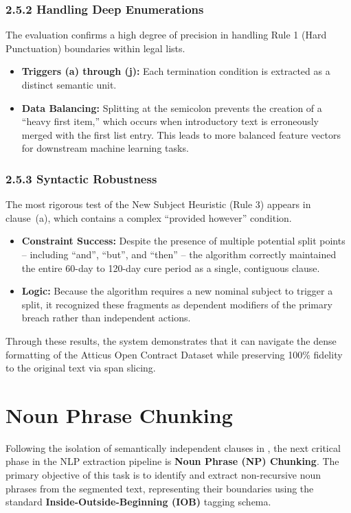 \documentclass[twoside,final]{hcmut-report}
\newcommand{\result}[1]{\fcolorbox{red}{white}{#1}}
\begin{document}
\subsubsection*{2.5.2 Handling Deep Enumerations}
The evaluation confirms a high degree of precision in handling Rule 1 (Hard Punctuation) boundaries within legal lists.

\begin{itemize}[topsep=0pt, parsep=0pt, itemsep=0pt]
  \item \textbf{Triggers (a) through (j):} Each termination condition is extracted as a distinct semantic unit.
  \item \textbf{Data Balancing:} Splitting at the semicolon prevents the creation of a ``heavy first item,'' which occurs when introductory text is erroneously merged with the first list entry. This leads to more balanced feature vectors for downstream machine learning tasks.
\end{itemize}

\subsubsection*{2.5.3 Syntactic Robustness}
The most rigorous test of the New Subject Heuristic (Rule 3) appears in clause~(a), which contains a complex ``provided however'' condition.

\begin{itemize}[topsep=0pt, parsep=0pt, itemsep=0pt]
  \item \textbf{Constraint Success:} Despite the presence of multiple potential split points -- including ``and'', ``but'', and ``then'' -- the algorithm correctly maintained the entire 60-day to 120-day cure period as a single, contiguous clause.
  \item \textbf{Logic:} Because the algorithm requires a new nominal subject to trigger a split, it recognized these fragments as dependent modifiers of the primary breach rather than independent actions.
\end{itemize}

Through these results, the system demonstrates that it can navigate the dense formatting of the Atticus Open Contract Dataset while preserving 100\% fidelity to the original text via span slicing.

\section{Noun Phrase Chunking}
\label{task_1.2}
Following the isolation of semantically independent clauses in \result{Section~\ref{task_1.1}}, the next critical phase in the NLP extraction pipeline is \textbf{Noun Phrase (NP) Chunking}. The primary objective of this task is to identify and extract non-recursive noun phrases from the segmented text, representing their boundaries using the standard \textbf{Inside-Outside-Beginning (IOB)} tagging schema.
\end{document}
